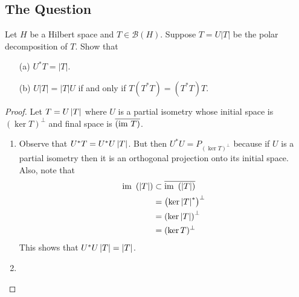 \subsection{The Question}
\horz

Let $H$ be a Hilbert space and $T\in \mathcal B(H).$ Suppose $T=U|T|$ be the polar decomposition of $T.$ Show that 
\begin{itemize}
\item[(a)] $U^*T=|T|.$
\item[(b)] $U|T|=|T|U$ if and only if $T (T^*T)= (T^*T)T.$ 
\end{itemize}

\horz

\begin{proof}
    Let $T=U\left\lvert T \right\rvert$ where $U$ is a partial isometry whose initial space is $\left( \ker T \right)^{\perp}$ and final space is $\overline{ \left( {\text{im }} T \right)}$.
    \begin{enumerate}
	\item Observe that $U^{*}T=U^{*}U\left\lvert T \right\rvert$. But then $U^{*}U=P_{(\ker T)^{\perp}}$ because if $U$ is a partial isometry then it is an orthogonal projection onto its initial space. Also, note that
	    \begin{align*}
		{\text{im }} \left( \left\lvert T \right\rvert \right) & \subset \overline{{\text{im }} \left( \left\lvert T \right\rvert \right)} \\
		&= \left( \ker \left\lvert T \right\rvert^{*} \right)^{\perp} \\
		&= \left( \ker \left\lvert T \right\rvert \right) ^{\perp} \\ 
		&= (\ker T)^{\perp}
	    \end{align*}
	    This shows that $U^{*}U \left\lvert T \right\rvert = \left\lvert T \right\rvert$.
	\item
	    
    \end{enumerate}
\end{proof}

